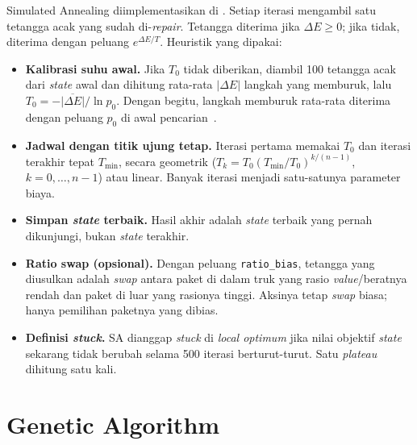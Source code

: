 Simulated Annealing diimplementasikan di .
Setiap iterasi mengambil satu tetangga acak yang sudah di-\textit{repair}. Tetangga
diterima jika $\Delta E\ge 0$; jika tidak, diterima dengan peluang $e^{\Delta E/T}$.
Heuristik yang dipakai:
\begin{itemize}
	\item \textbf{Kalibrasi suhu awal.} Jika $T_0$ tidak diberikan, diambil 100 tetangga
	acak dari \textit{state} awal dan dihitung rata-rata $|\Delta E|$ langkah yang
	memburuk, lalu $T_0=-\overline{|\Delta E|}/\ln p_0$. Dengan begitu, langkah memburuk
	rata-rata diterima dengan peluang $p_0$ di awal pencarian~\cite{benameur2004t0}.
	\item \textbf{Jadwal dengan titik ujung tetap.} Iterasi pertama memakai $T_0$ dan iterasi
	terakhir tepat $T_{\min}$, secara geometrik ($T_k=T_0(T_{\min}/T_0)^{k/(n-1)}$,
	$k=0,\dots,n-1$) atau linear.
	Banyak iterasi menjadi satu-satunya parameter biaya.
	\item \textbf{Simpan \textit{state} terbaik.} Hasil akhir adalah \textit{state} terbaik
	yang pernah dikunjungi, bukan \textit{state} terakhir.
	\item \textbf{Ratio swap (opsional).} Dengan peluang \texttt{ratio\_bias}, tetangga yang
	diusulkan adalah \textit{swap} antara paket di dalam truk yang rasio
	\textit{value}/beratnya rendah dan paket di luar yang rasionya tinggi. Aksinya
	tetap \textit{swap} biasa; hanya pemilihan paketnya yang dibias.
	\item \textbf{Definisi \textit{stuck}.} SA dianggap \textit{stuck} di \textit{local optimum}
	jika nilai objektif \textit{state} sekarang tidak berubah selama 500 iterasi
	berturut-turut. Satu \textit{plateau} dihitung satu kali.
\end{itemize}




\section{Genetic Algorithm}
\label{sec:ga-impl}

